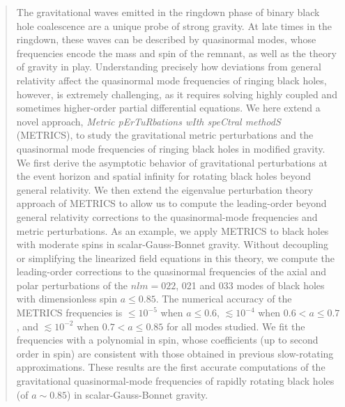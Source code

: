 \documentclass[aps,prx,amsmath,floats,floatfix,twocolumn,
  superscriptaddress,nofootinbib,showpacs]{revtex4-1}
\begin{document}
\begin{abstract} 

The gravitational waves emitted in the ringdown phase of binary black hole coalescence are a unique probe of strong gravity.
%
At late times in the ringdown, these waves can be described by quasinormal modes, whose frequencies encode the mass and spin of the remnant, as well as the theory of gravity in play. 
%
Understanding precisely how deviations from general relativity affect the quasinormal mode frequencies of ringing black holes, however, is extremely challenging, as it requires solving highly coupled and sometimes higher-order partial differential equations.
%
We here extend a novel approach, \textit{Metric pErTuRbations wIth speCtral methodS} (METRICS), to study the gravitational metric perturbations and the quasinormal mode frequencies of ringing black holes in modified gravity. 
%
We first derive the asymptotic behavior of gravitational perturbations at the event horizon and spatial infinity for rotating black holes beyond general relativity.
%
We then extend the eigenvalue perturbation theory approach of METRICS to allow us to compute the leading-order beyond general relativity corrections to the quasinormal-mode frequencies and metric perturbations.
%
As an example, we apply METRICS to black holes with moderate spins in scalar-Gauss-Bonnet gravity.
%
Without decoupling or simplifying the linearized field equations in this theory, we compute the leading-order corrections to the quasinormal frequencies of the axial and polar perturbations of the $nlm = 022$, 021 and 033 modes of black holes with dimensionless spin $a \leq 0.85$.
%
The numerical accuracy of the METRICS frequencies is $\leq 10^{-5}$ when $a \leq 0.6$, $\lesssim 10^{-4}$ when $0.6 < a \leq 0.7 $, and $\lesssim 10^{-2}$ when $0.7 < a \leq 0.85 $ for all modes studied. 
We fit the frequencies with a polynomial in spin, whose coefficients (up to second order in spin) are consistent with those obtained in previous slow-rotating approximations.
%
These results are the first accurate computations of the gravitational quasinormal-mode frequencies of rapidly rotating black holes (of $a \sim 0.85$) in scalar-Gauss-Bonnet gravity.
\end{abstract}

\maketitle
\end{document}
